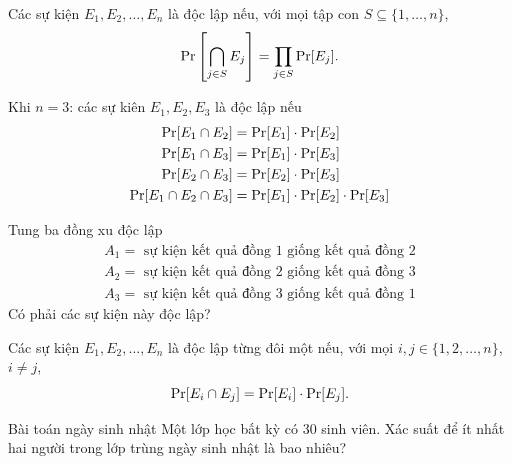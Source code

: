 \begin{frame}
	\begin{dfntn}
		Các sự kiện $E_1, E_2, \dots, E_n$ là độc lập nếu, với mọi tập con $S \subseteq \{1, \dots, n\}$, 
		\[
			\mathrm{Pr}\left[\bigcap_{j\in S} E_j \right] = \prod_{j \in S}\mathrm{Pr}[E_j].
		\] 
	\end{dfntn}
	\begin{xmpl}
		Khi $n = 3$: các sự kiên $E_1, E_2, E_3$ là độc lập nếu 
		\begin{align*}
			\mathrm{Pr}[E_1 \cap E_2] &= \mathrm{Pr}[E_1]\cdot \mathrm{Pr}[E_2]\\
			\mathrm{Pr}[E_1 \cap E_3] &= \mathrm{Pr}[E_1]\cdot \mathrm{Pr}[E_3]\\
			\mathrm{Pr}[E_2 \cap E_3] &= \mathrm{Pr}[E_2]\cdot \mathrm{Pr}[E_3]\\
			\mathrm{Pr}[E_1 \cap E_2 \cap E_3] &= \mathrm{Pr}[E_1]\cdot \mathrm{Pr}[E_2] \cdot \mathrm{Pr}[E_3]
		\end{align*}
	\end{xmpl}
\end{frame}

\begin{frame}
	\begin{xmpl}
		Tung ba đồng xu độc lập
		\begin{align*}
			A_1 = \text{ sự kiện kết quả đồng 1 giống kết quả đồng 2}\\
			A_2 = \text{ sự kiện kết quả đồng 2 giống kết quả đồng 3}\\
			A_3 = \text{ sự kiện kết quả đồng 3 giống kết quả đồng 1}
		\end{align*} 
		Có phải các sự kiện này độc lập? 
	\end{xmpl}
\end{frame}

\begin{frame}
	\begin{dfntn}
		Các sự kiện $E_1, E_2, \dots, E_n$ là độc lập từng đôi một nếu, với mọi  $i, j \in \{1,2,\dots, n\}$, $i\not=j$, 
		\[
			\mathrm{Pr}[E_i \cap E_j] = \mathrm{Pr}[E_i]\cdot \mathrm{Pr}[E_j].
		\] 
	\end{dfntn}
\end{frame}

\begin{frame}
	\begin{block}{Bài toán ngày sinh nhật}
		Một lớp học bất kỳ có $30$ sinh viên. Xác suất để ít nhất hai người trong lớp trùng ngày sinh nhật  là bao nhiêu?
	\end{block}
\end{frame}

